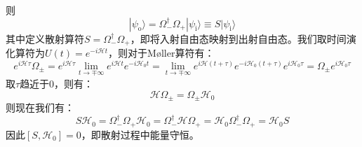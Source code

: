 则
\begin{equation}
|\psi_{\text{o}}\rangle=\Omega_-^\dagger\Omega_+|\psi_{\text{i}}\rangle\equiv S|\psi_{\text{i}}\rangle
\end{equation}
其中定义散射算符$S=\Omega_-^\dagger\Omega_+$，即将入射自由态映射到出射自由态。我们取时间演化算符为$U(t)=e^{-i\mathcal{H}t}$，则对于M\o{}ller算符有：
\begin{equation}
e^{i\mathcal{H}\tau}\Omega_\pm=e^{i\mathcal{H}\tau}\lim\limits_{t\rightarrow\mp\infty}e^{i\mathcal{H}t}e^{-i\mathcal{H}_0t}=\lim\limits_{t\rightarrow\mp\infty}e^{i\mathcal{H}(t+\tau)}e^{-i\mathcal{H}_0(t+\tau)}e^{i\mathcal{H}_0\tau}=\Omega_\pm e^{i\mathcal{H}_0\tau}
\end{equation}
取$\tau$趋近于0，则有：
\begin{equation}
\mathcal{H}\Omega_\pm=\Omega_\pm\mathcal{H}_0
\end{equation}
则现在我们有：
\begin{equation}
S\mathcal{H}_0=\Omega_-^\dagger\Omega_+\mathcal{H}_0=\Omega_-^\dagger\mathcal{H}\Omega_+=\mathcal{H}_0\Omega_-^\dagger\Omega_+=\mathcal{H}_0S
\end{equation}
因此$[S,\mathcal{H}_0]=0$，即散射过程中能量守恒。

